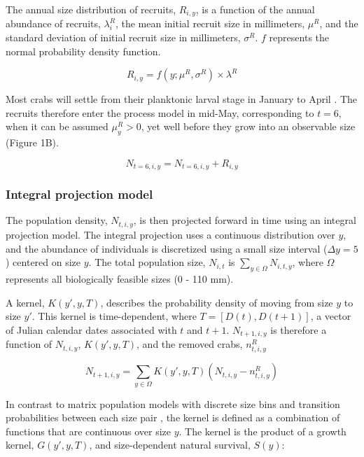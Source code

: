 \documentclass{article}
\begin{document}
The annual size distribution of recruits, $R_{i, y}$, is a function of the annual abundance of recruits, $\lambda^R_i$, the mean initial recruit size in millimeters, $\mu^R$, and the standard deviation of initial recruit size in millimeters, $\sigma^R$. $f$ represents the normal probability density function.

\begin{equation}
R_{i, y} = f(y; \mu^R, \sigma^R) \times \lambda^R
\end{equation}

Most crabs will settle from their planktonic larval stage in January to April \parencite{yamada2005growth}. The recruits therefore enter the process model in mid-May, corresponding to $t=6$, when it can be assumed $\mu^R_y > 0$, yet well before they grow into an observable size (Figure 1B).

\begin{equation}
N_{t=6, i, y} =  N_{t=6, i, y} + R_{i, y}
\end{equation}

\subsubsection*{Integral projection model}

The population density, $N_{t,i,y}$, is then projected forward in time using an integral projection model. The integral projection uses a continuous distribution over $y$, and the abundance of individuals is discretized using a small size interval ($\Delta y = 5$) centered on size $y$. The total population size, $N_{i,t}$ is $\sum_{y \in \Omega} N_{i,t,y}$, where $\Omega$ represents all biologically feasible sizes (0 - 110 mm).

A kernel, $K(y', y, T)$, describes the probability density of moving from size $y$ to size $y'$. This kernel is time-dependent, where $T = [D(t), D(t+1)]$, a vector of Julian calendar dates associated with $t$ and $t+1$. $N_{t+1,i,y}$ is therefore a function of $N_{t,i,y}$, $K(y', y, T)$, and the removed crabs, $n^R_{t,i,y}$

\begin{equation}
N_{t+1,i,y} = \sum_{y \in \Omega} K(y',y, T) (N_{t,i,y} - n^R_{t,i,y}) 
\end{equation}

In contrast to matrix population models with discrete size bins and transition probabilities between each size pair \parencite{caswell2001matrix}, the kernel is defined as a combination of functions that are continuous over size $y$. The kernel is the product of a growth kernel, $G(y',y, T)$, and size-dependent natural survival, $S(y)$:
\end{document}
